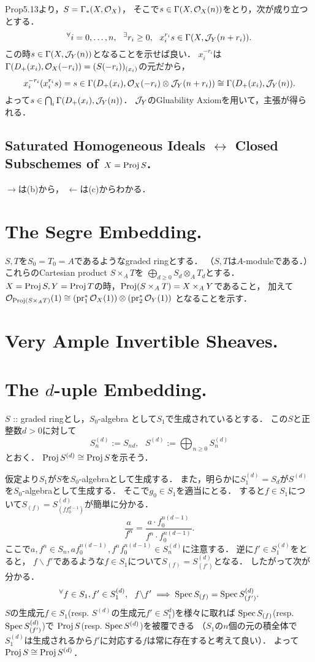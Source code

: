 \documentclass[a4paper]{jsarticle}
\begin{document}
    Prop5.13より，$S=\Gamma_*(X,\mathcal{O}_X)$，
    そこで$s \in \Gamma(X,\mathcal{O}_X(n))$をとり，次が成り立つとする．
    \[ {}^{\forall} i=0,\dots,n,~~ {}^{\exists} r_i \geq 0,~~ x_i^{r_i}s \in \Gamma(X,\mathcal{J}_Y(n+r_i)). \]
    この時$s \in \Gamma(X,\mathcal{J}_Y(n))$となることを示せば良い．
    $x_i^{-r_i}$は$\Gamma(D_+(x_i),\mathcal{O}_X(-r_i))=(S(-r_i))_{(x_i)}$の元だから，
    \[  x_i^{-r_i}(x_i^{r_i}s)=s \in \Gamma(D_+(x_i),\mathcal{O}_X(-r_i) \otimes \mathcal{J}_Y(n+r_i)) \cong \Gamma(D_+(x_i),\mathcal{J}_Y(n)). \]
    よって$s \in \bigcap_i \Gamma(D_+(x_i),\mathcal{J}_Y(n))$．
    $\mathcal{J}_Y$のGluability Axiomを用いて，主張が得られる．

    \subsection{Saturated Homogeneous Ideals $\leftrightarrow$ Closed Subschemes of $X=\operatorname{Proj} S$.}
    $\rightarrow$は(b)から，
    $\leftarrow$は(c)からわかる．

\section{The Segre Embedding.} %
    $S,T$を$S_0=T_0=A$であるようなgraded ringとする．
    （$S,T$は$A$-moduleである．）
    これらのCartesian product $S \times_A T$を
    $\bigoplus_{d \geq 0} S_d \otimes_A T_d$とする．
    $X=\operatorname{Proj} S, Y=\operatorname{Proj} T$の時，$\operatorname{Proj} (S \times_A T)=X \times_A Y$であること，
    加えて$\mathcal{O}_{\operatorname{Proj} (S \times_A T)}(1) \cong (\operatorname{pr}_1^*\mathcal{O}_{X}(1)) \otimes (\operatorname{pr}_2^*\mathcal{O}_Y(1))$
    となることを示す．

\section{Very Ample Invertible Sheaves.} %

\section{The $d$-uple Embedding.} %
    $S$ :: graded ringとし，$S_0$-algebra として$S_1$で生成されているとする．
    この$S$と正整数$d>0$に対して
    \[ S_n^{(d)}:=S_{nd},~~~ S^{(d)}:=\bigoplus_{n \geq 0} S_n^{(d)} \]
    とおく．
    $\operatorname{Proj} S^{(d)} \cong \operatorname{Proj} S$を示そう．

    仮定より$S_{1}$が$S$を$S_0$-algebraとして生成する．
    また，明らかに$S_{1}^{(d)}=S_d$が$S^{(d)}$を$S_0$-algebraとして生成する．
    そこで$g_0 \in S_1$を適当にとる．
    すると$f \in S_1$について$S_{(f)}=S_{(f f_0^{d-1})}^{(d)}$が簡単に分かる．
    \[ \frac{a}{f^n}=\frac{a \cdot f_0^{n(d-1)}}{f^n \cdot f_0^{n(d-1)}}. \]
    ここで$a, f^n \in S_n, a f_0^{n(d-1)}, f^n f_0^{n(d-1)} \in S_n^{(d)}$に注意する．
    逆に$f' \in S_1^{(d)}$をとると，
    $f \backslash f'$であるような$f \in S_1$について$S_{(f)}=S_{(f')}^{(d)}$となる．
    したがって次が分かる．
    \[ {}^{\forall} f \in S_1, f' \in S_1^{(d)},~~ f \backslash f' \implies \operatorname{Spec} S_{(f)}=\operatorname{Spec} S_{(f')}^{(d)}. \]
    $S$の生成元$f \in S_1$(resp. $S^{(d)}$の生成元$f' \in S_1^{d}$)を様々に取れば
    $\operatorname{Spec} S_{(f)}$(resp. $\operatorname{Spec} S_{(f')}^{(d)}$)で
    $\operatorname{Proj} S$(resp. $\operatorname{Spec} S^{(d)}$)を被覆できる
    （$S_1$の$n$個の元の積全体で$S_1^{(d)}$は生成されるから$f'$に対応する$f$は常に存在すると考えて良い）．
    よって$\operatorname{Proj} S \cong \operatorname{Proj} S^{(d)}$．
\end{document}
